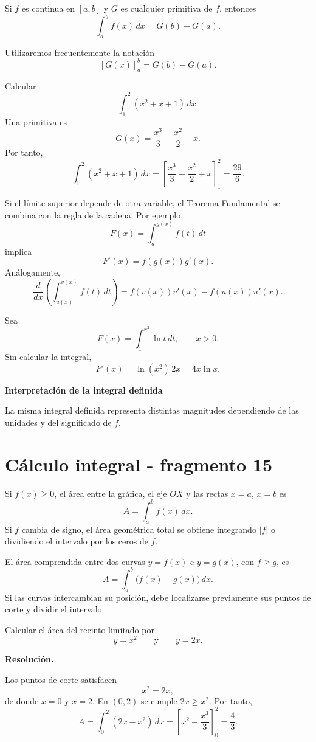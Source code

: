 \begin{theorem}
Si $f$ es continua en $[a,b]$ y $G$ es cualquier primitiva de $f$, entonces
\[
\boxed{\int_a^b f(x)\,dx=G(b)-G(a).}
\]
\end{theorem}

Utilizaremos frecuentemente la notación
\[
\left[G(x)\right]_a^b=G(b)-G(a).
\]

\begin{example}
Calcular
\[
\int_1^2(x^2+x+1)\,dx.
\]
Una primitiva es
\[
G(x)=\frac{x^3}{3}+\frac{x^2}{2}+x.
\]
Por tanto,
\[
\int_1^2(x^2+x+1)\,dx
=
\left[\frac{x^3}{3}+\frac{x^2}{2}+x\right]_1^2
=
\frac{29}{6}.
\]
\end{example}

Si el límite superior depende de otra variable, el Teorema Fundamental se combina con la regla de la cadena. Por ejemplo,
\[
F(x)=\int_a^{g(x)}f(t)\,dt
\]
implica
\[
\boxed{F'(x)=f(g(x))g'(x).}
\]
Análogamente,
\[
\frac{d}{dx}\left(\int_{u(x)}^{v(x)}f(t)\,dt\right)
=
f(v(x))v'(x)-f(u(x))u'(x).
\]

\begin{example}
Sea
\[
F(x)=\int_1^{x^2}\ln t\,dt,
\qquad x>0.
\]
Sin calcular la integral,
\[
F'(x)=\ln(x^2)\,2x=4x\ln x.
\]
\end{example}

\textbf{Interpretación de la integral definida}

La misma integral definida representa distintas magnitudes dependiendo de las unidades y del significado de $f$.


\section{Cálculo integral - fragmento 15}
Si $f(x)\geq0$, el área entre la gráfica, el eje $OX$ y las rectas $x=a$, $x=b$ es
\[
A=\int_a^b f(x)\,dx.
\]
Si $f$ cambia de signo, el área geométrica total se obtiene integrando $|f|$ o dividiendo el intervalo por los ceros de $f$.

El área comprendida entre dos curvas $y=f(x)$ e $y=g(x)$, con $f\geq g$, es
\[
A=\int_a^b\bigl(f(x)-g(x)\bigr)\,dx.
\]
Si las curvas intercambian su posición, debe localizarse previamente sus puntos de corte y dividir el intervalo.

\begin{solvedexercise}
Calcular el área del recinto limitado por
\[
y=x^2
\qquad\text{y}\qquad
y=2x.
\]

\textbf{Resolución.}\par\smallskip
Los puntos de corte satisfacen
\[
x^2=2x,
\]
de donde $x=0$ y $x=2$. En $(0,2)$ se cumple $2x\geq x^2$. Por tanto,
\[
A=\int_0^2(2x-x^2)\,dx
=
\left[x^2-\frac{x^3}{3}\right]_0^2
=
\boxed{\frac43}.
\]
\end{solvedexercise}

